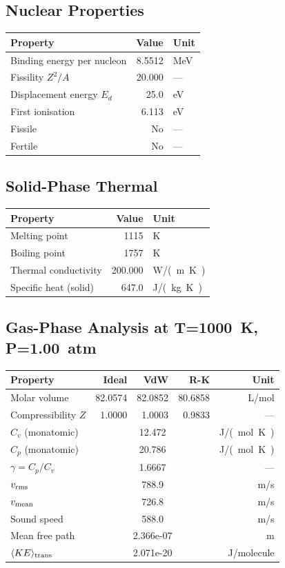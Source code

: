\documentclass[11pt,a4paper]{article}
\begin{document}
\subsection{Nuclear Properties}
\begin{tabular}{lrl}
  \toprule
  Property & Value & Unit \\
  \midrule
  Binding energy per nucleon & 8.5512 & \si{MeV} \\
  Fissility $Z^2/A$ & 20.000 & --- \\
  Displacement energy $E_d$ & 25.0 & \si{eV} \\
  First ionisation & 6.113 & \si{eV} \\
  Fissile & No & --- \\
  Fertile & No & --- \\
  \bottomrule
\end{tabular}

\subsection{Solid-Phase Thermal}
\begin{tabular}{lrl}
  \toprule
  Property & Value & Unit \\
  \midrule
  Melting point & 1115 & \si{K} \\
  Boiling point & 1757 & \si{K} \\
  Thermal conductivity & 200.000 & \si{W/(m.K)} \\
  Specific heat (solid) & 647.0 & \si{J/(kg.K)} \\
  \bottomrule
\end{tabular}

\subsection{Gas-Phase Analysis at T=\SI{1000}{K}, P=\SI{1.00}{atm}}
\begin{tabular}{lrrrr}
  \toprule
  Property & Ideal & VdW & R-K & Unit \\
  \midrule
  Molar volume & 82.0574 & 82.0852 & 80.6858 & \si{L/mol} \\
  Compressibility $Z$ & 1.0000 & 1.0003 & 0.9833 & --- \\
  \midrule
  $C_v$ (monatomic) & \multicolumn{3}{c}{12.472} & \si{J/(mol.K)} \\
  $C_p$ (monatomic) & \multicolumn{3}{c}{20.786} & \si{J/(mol.K)} \\
  $\gamma = C_p/C_v$ & \multicolumn{3}{c}{1.6667} & --- \\
  $v_{\rm rms}$ & \multicolumn{3}{c}{788.9} & \si{m/s} \\
  $v_{\rm mean}$ & \multicolumn{3}{c}{726.8} & \si{m/s} \\
  Sound speed & \multicolumn{3}{c}{588.0} & \si{m/s} \\
  Mean free path & \multicolumn{3}{c}{2.366e-07} & \si{m} \\
  $\langle KE \rangle_{\rm trans}$ & \multicolumn{3}{c}{2.071e-20} & \si{J/molecule} \\
  \bottomrule
\end{tabular}
\end{document}
